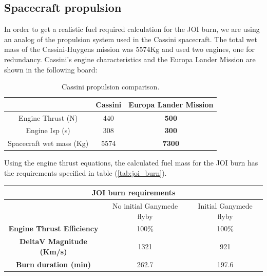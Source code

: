 \subsection*{Spacecraft propulsion}
In order to get a realistic fuel required calculation for the JOI burn, we are using an analog of the propulsion system used in the Cassini spacecraft. The total wet mass of the Cassini-Huygens mission was 5574Kg and used two engines, one for redundancy.
Cassini's engine characteristics and the Europa Lander Mission are shown in the following board:
\begin{table}[htb]
  \centering
    \begin{tabular}{|c|c|c|}
    \hline
          & \textbf{Cassini} & \textbf{Europa Lander Mission} \bigstrut\\
    \hline
    Engine Thrust (N) & 440   & \textbf{500} \bigstrut\\
    \hline
    Engine Isp (s) & 308   & \textbf{300} \bigstrut\\
    \hline
    Spacecraft wet mass (Kg) & 5574  & \textbf{7300} \bigstrut\\
    \hline
    \end{tabular}%
    \caption{Cassini propulsion comparison.}
  \label{tab:propulsion}%
\end{table}%
Using the engine thrust equations, the calculated fuel mass for the JOI burn has the requirements specified in table (\ref{tab:joi_burn}).
\begin{table}[htb]
  \centering
    \begin{tabular}{|c|c|c|}
    \multicolumn{3}{c}{\textbf{JOI burn requirements }} \bigstrut[b]\\
    \hline
    \textbf{} & No initial Ganymede flyby & Initial Ganymede flyby \bigstrut\\
    \hline
    \textbf{Engine Thrust Efficiency} & 100\% & 100\% \bigstrut\\
    \hline
    \textbf{DeltaV Magnitude (Km/s)} & 1321  & 921 \bigstrut\\
    \hline
    \textbf{Burn duration (min)} & 262.7 & 197.6 \bigstrut\\
    \hline
    \end{tabular}%
  \label{tab:joi_burn_req}%
\end{table}%
